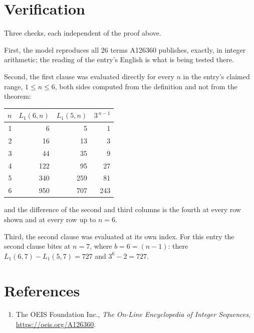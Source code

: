 \documentclass[11pt,a4paper]{article}
\theoremstyle{plain}
\theoremstyle{definition}
\begin{document}
\section{Verification}

Three checks, each independent of the proof above.

First, the model reproduces all $26$ terms A126360 publishes, exactly, in integer
arithmetic; the reading of the entry's English is what is being tested there.

Second, the first clause was evaluated directly for every $n$ in the entry's claimed range,
$1\le n\le6$, both sides computed from the definition and not from the theorem:

\begin{center}
\begin{tabular}{rrrr}
$n$ & $L_{1}(6,n)$ & $L_{1}(5,n)$ & $3^{\,n-1}$ \\ \hline
1 & 6 & 5 & 1 \\
2 & 16 & 13 & 3 \\
3 & 44 & 35 & 9 \\
4 & 122 & 95 & 27 \\
5 & 340 & 259 & 81 \\
6 & 950 & 707 & 243 \\
\end{tabular}
\end{center}

\noindent and the difference of the second and third columns is the fourth at every row shown
and at every row up to $n=6$.

Third, the second clause was evaluated at its own index. For this entry the second clause bites at $n=7$, where $b=6=(n-1)$: there $L_{1}(6,7)-L_{1}(5,7)=727$ and $3^{6}-2=727$.

\section*{References}
\begin{enumerate}
\item The OEIS Foundation Inc., \emph{The On-Line Encyclopedia of Integer Sequences},
\url{https://oeis.org/A126360}.
\end{enumerate}
\end{document}
